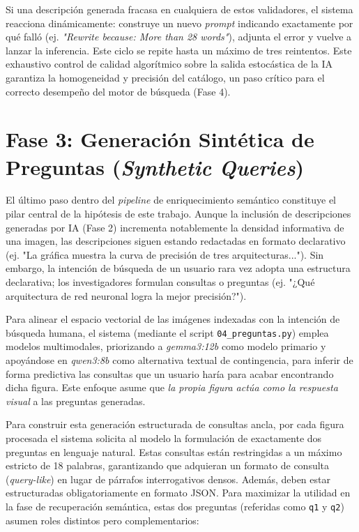\documentclass[a4paper]{report}
\begin{document}
Si una descripción generada fracasa en cualquiera de estos validadores, el sistema reacciona dinámicamente: construye un nuevo \textit{prompt} indicando exactamente por qué falló (ej. \textit{"Rewrite because: More than 28 words"}), adjunta el error y vuelve a lanzar la inferencia. Este ciclo se repite hasta un máximo de tres reintentos. Este exhaustivo control de calidad algorítmico sobre la salida estocástica de la IA garantiza la homogeneidad y precisión del catálogo, un paso crítico para el correcto desempeño del motor de búsqueda (Fase 4).

\section{Fase 3: Generación Sintética de Preguntas (\textit{Synthetic Queries})}
\label{sec:metodologia_preguntas}

El último paso dentro del \textit{pipeline} de enriquecimiento semántico constituye el pilar central de la hipótesis de este trabajo. Aunque la inclusión de descripciones generadas por IA (Fase 2) incrementa notablemente la densidad informativa de una imagen, las descripciones siguen estando redactadas en formato declarativo (ej. "La gráfica muestra la curva de precisión de tres arquitecturas..."). Sin embargo, la intención de búsqueda de un usuario rara vez adopta una estructura declarativa; los investigadores formulan consultas o preguntas (ej. "¿Qué arquitectura de red neuronal logra la mejor precisión?"). 

Para alinear el espacio vectorial de las imágenes indexadas con la intención de búsqueda humana, el sistema (mediante el script \texttt{04\_preguntas.py}) emplea modelos multimodales, priorizando a \textit{gemma3:12b} como modelo primario y apoyándose en \textit{qwen3:8b} como alternativa textual de contingencia, para inferir de forma predictiva las consultas que un usuario haría para acabar encontrando dicha figura. Este enfoque asume que \textit{la propia figura actúa como la respuesta visual} a las preguntas generadas.

Para construir esta generación estructurada de consultas ancla, por cada figura procesada el sistema solicita al modelo la formulación de exactamente dos preguntas en lenguaje natural. Estas consultas están restringidas a un máximo estricto de 18 palabras, garantizando que adquieran un formato de consulta (\textit{query-like}) en lugar de párrafos interrogativos densos. Además, deben estar estructuradas obligatoriamente en formato JSON. Para maximizar la utilidad en la fase de recuperación semántica, estas dos preguntas (referidas como \texttt{q1} y \texttt{q2}) asumen roles distintos pero complementarios:
\end{document}
